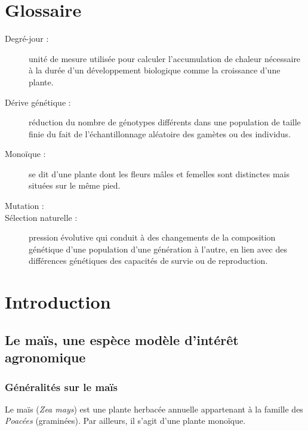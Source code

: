 \documentclass[12pt,a4paper]{article}
\begin{document}
	
	\tableofcontents
	\listoffigures
	\newpage
	
		\section*{Glossaire}
			\begin{description}
				
				\item [Degré-jour :] unité de mesure utilisée pour calculer l'accumulation de chaleur nécessaire à la durée d'un développement biologique comme la croissance d'une plante.
				
				\item [Dérive génétique :] réduction du nombre de génotypes différents dans une population de taille finie du fait de l'échantillonnage aléatoire des gamètes ou des individus.
				
				\item [Monoïque :] se dit d'une plante dont les fleurs mâles et femelles sont distinctes mais situées sur le même pied.
				
				\item [Mutation :] 
				
				\item [Sélection naturelle :] pression évolutive qui conduit à des changements de la composition génétique d'une population d'une génération à l'autre, en lien avec des différences génétiques des capacités de survie ou de reproduction.
				
			
				
			\end{description}
			
			\newpage
			
		\section{Introduction}
				\subsection{Le maïs, une espèce modèle d'intérêt agronomique}
					\subsubsection{Généralités sur le maïs}
						Le maïs (\textit{Zea mays}) est une plante herbacée annuelle appartenant à la famille des \emph{Poacées} (graminées). Par ailleurs, il s'agit d'une plante monoïque.
						
\end{document}
